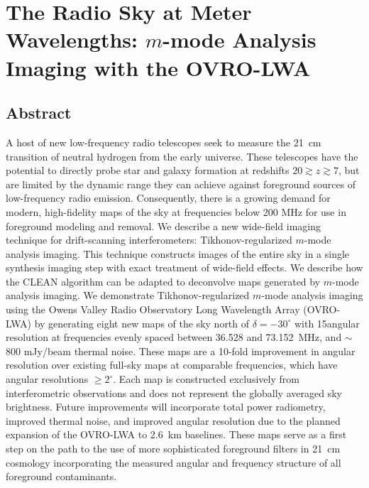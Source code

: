 \chapter{The Radio Sky at Meter Wavelengths: $m$-mode Analysis Imaging with the OVRO-LWA}
\label{chapter3}


\begin{bibunit}

\section*{Abstract}
A host of new low-frequency radio telescopes seek to measure the 21~cm transition of neutral
hydrogen from the early universe.  These telescopes have the potential to directly probe star and
galaxy formation at redshifts $20 \gtrsim z \gtrsim 7$, but are limited by the dynamic range they
can achieve against foreground sources of low-frequency radio emission. Consequently, there is a
growing demand for modern, high-fidelity maps of the sky at frequencies below 200 MHz for use in
foreground modeling and removal.  We describe a new wide-field imaging technique for drift-scanning
interferometers: Tikhonov-regularized $m$-mode analysis imaging.  This technique constructs images
of the entire sky in a single synthesis imaging step with exact treatment of wide-field effects.  We
describe how the CLEAN algorithm can be adapted to deconvolve maps generated by $m$-mode analysis
imaging. We demonstrate Tikhonov-regularized $m$-mode analysis imaging using the Owens Valley Radio
Observatory Long Wavelength Array (OVRO-LWA) by generating eight new maps of the sky north of
$\delta=-30^\circ$ with 15\arcmin angular resolution at frequencies evenly spaced between 36.528 and
73.152~MHz, and $\sim$800 mJy/beam thermal noise.  These maps are a 10-fold improvement in angular
resolution over existing full-sky maps at comparable frequencies, which have angular resolutions
$\ge 2^\circ$. Each map is constructed exclusively from interferometric observations and does not
represent the globally averaged sky brightness. Future improvements will incorporate total power
radiometry, improved thermal noise, and improved angular resolution due to the planned expansion of
the OVRO-LWA to 2.6~km baselines.  These maps serve as a first step on the path to the use of more
sophisticated foreground filters in 21~cm cosmology incorporating the measured angular and frequency
structure of all foreground contaminants.


\end{bibunit}
